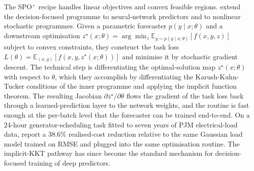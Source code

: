 The SPO$^+$ recipe handles linear objectives and convex feasible regions.
\citet{DontiAmosKolter2017} extend the decision-focused programme to
neural-network predictors and to nonlinear stochastic programmes. Given a
parametric forecaster $p(y \mid x; \theta)$ and a downstream optimisation
$z^\star(x; \theta) = \arg\min_z \mathbb E_{y \sim p(y \mid x; \theta)}
[f(x, y, z)]$ subject to convex constraints, they construct the task loss
$L(\theta) = \mathbb E_{(x, y)}[f(x, y, z^\star(x; \theta))]$ and minimise
it by stochastic gradient descent. The technical step is differentiating
the optimal-solution map $z^\star(x; \theta)$ with respect to $\theta$,
which they accomplish by differentiating the Karush-Kuhn-Tucker conditions
of the inner programme and applying the implicit function theorem. The
resulting Jacobian $\partial z^\star / \partial \theta$ flows the gradient
of the task loss back through a learned-prediction layer to the network
weights, and the routine is fast enough at the per-batch level that the
forecaster can be trained end-to-end. On a 24-hour generator-scheduling
task fitted to seven years of PJM electrical-load data,
\citet{DontiAmosKolter2017} report a $38.6\%$ realised-cost reduction
relative to the same Gaussian load model trained on RMSE and plugged into
the same optimisation routine. The implicit-KKT pathway has since become
the standard mechanism for decision-focused training of deep predictors.

